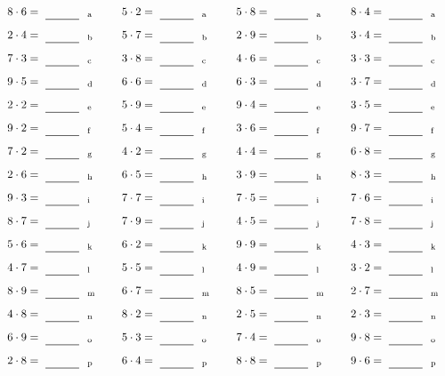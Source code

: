 \documentclass
[
  draft    = true,
  fontsize = 11pt,
  parskip  = half-
]
{scrartcl}
\begin{document}
\par\vfill\par
\begin{align*}
    \pline{8\cdot6}&=\rline{a}
  & \pline{5\cdot2}&=\rline{a}
  & \pline{5\cdot8}&=\rline{a}
  & \pline{8\cdot4}&=\rline{a} \\[1ex]
    \pline{2\cdot4}&=\rline{b}
  & \pline{5\cdot7}&=\rline{b}
  & \pline{2\cdot9}&=\rline{b}
  & \pline{3\cdot4}&=\rline{b} \\[1ex]
    \pline{7\cdot3}&=\rline{c}
  & \pline{3\cdot8}&=\rline{c}
  & \pline{4\cdot6}&=\rline{c}
  & \pline{3\cdot3}&=\rline{c} \\[1ex]
    \pline{9\cdot5}&=\rline{d}
  & \pline{6\cdot6}&=\rline{d}
  & \pline{6\cdot3}&=\rline{d}
  & \pline{3\cdot7}&=\rline{d} \\[1ex]
    \pline{2\cdot2}&=\rline{e}
  & \pline{5\cdot9}&=\rline{e}
  & \pline{9\cdot4}&=\rline{e}
  & \pline{3\cdot5}&=\rline{e} \\[1ex]
    \pline{9\cdot2}&=\rline{f}
  & \pline{5\cdot4}&=\rline{f}
  & \pline{3\cdot6}&=\rline{f}
  & \pline{9\cdot7}&=\rline{f} \\[1ex]
    \pline{7\cdot2}&=\rline{g}
  & \pline{4\cdot2}&=\rline{g}
  & \pline{4\cdot4}&=\rline{g}
  & \pline{6\cdot8}&=\rline{g} \\[1ex]
    \pline{2\cdot6}&=\rline{h}
  & \pline{6\cdot5}&=\rline{h}
  & \pline{3\cdot9}&=\rline{h}
  & \pline{8\cdot3}&=\rline{h} \\[1ex]
    \pline{9\cdot3}&=\rline{i}
  & \pline{7\cdot7}&=\rline{i}
  & \pline{7\cdot5}&=\rline{i}
  & \pline{7\cdot6}&=\rline{i} \\[1ex]
    \pline{8\cdot7}&=\rline{j}
  & \pline{7\cdot9}&=\rline{j}
  & \pline{4\cdot5}&=\rline{j}
  & \pline{7\cdot8}&=\rline{j} \\[1ex]
    \pline{5\cdot6}&=\rline{k}
  & \pline{6\cdot2}&=\rline{k}
  & \pline{9\cdot9}&=\rline{k}
  & \pline{4\cdot3}&=\rline{k} \\[1ex]
    \pline{4\cdot7}&=\rline{l}
  & \pline{5\cdot5}&=\rline{l}
  & \pline{4\cdot9}&=\rline{l}
  & \pline{3\cdot2}&=\rline{l} \\[1ex]
    \pline{8\cdot9}&=\rline{m}
  & \pline{6\cdot7}&=\rline{m}
  & \pline{8\cdot5}&=\rline{m}
  & \pline{2\cdot7}&=\rline{m} \\[1ex]
    \pline{4\cdot8}&=\rline{n}
  & \pline{8\cdot2}&=\rline{n}
  & \pline{2\cdot5}&=\rline{n}
  & \pline{2\cdot3}&=\rline{n} \\[1ex]
    \pline{6\cdot9}&=\rline{o}
  & \pline{5\cdot3}&=\rline{o}
  & \pline{7\cdot4}&=\rline{o}
  & \pline{9\cdot8}&=\rline{o} \\[1ex]
    \pline{2\cdot8}&=\rline{p}
  & \pline{6\cdot4}&=\rline{p}
  & \pline{8\cdot8}&=\rline{p}
  & \pline{9\cdot6}&=\rline{p}
\end{align*}
\end{document}
